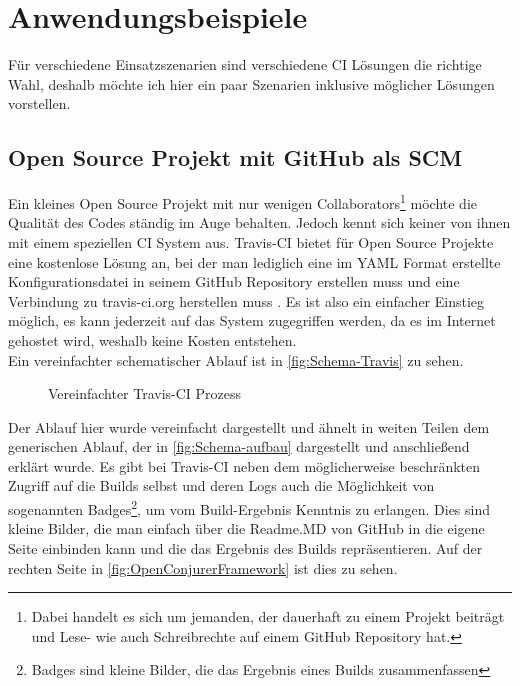 \pagebreak

\chapter{Anwendungsbeispiele}
Für verschiedene Einsatzszenarien sind verschiedene CI Lösungen die richtige Wahl, deshalb möchte ich hier ein paar Szenarien inklusive möglicher Lösungen vorstellen.
\section{Open Source Projekt mit GitHub als SCM}
Ein kleines Open Source Projekt mit nur wenigen Collaborators\footnote{Dabei handelt es sich um jemanden, der dauerhaft zu einem Projekt beiträgt und Lese- wie auch Schreibrechte auf einem GitHub Repository hat.} möchte die Qualität des Codes ständig im Auge behalten. Jedoch kennt sich keiner von ihnen mit einem speziellen CI System aus. Travis-CI bietet für Open Source Projekte eine kostenlose Lösung an, bei der man lediglich eine im YAML Format erstellte Konfigurationsdatei in seinem GitHub Repository erstellen muss und eine Verbindung zu travis-ci.org herstellen muss \cite{Travis-getting-started}. Es ist also ein einfacher Einstieg möglich, es kann jederzeit auf das System zugegriffen werden, da es im Internet gehostet wird, weshalb keine Kosten entstehen.\\
Ein vereinfachter schematischer Ablauf ist in \autoref{fig:Schema-Travis} zu sehen.
\begin{figure}[H]
  \centering
  \caption{Vereinfachter Travis-CI Prozess}\label{fig:Schema-Travis}
\end{figure}
Der Ablauf hier wurde vereinfacht dargestellt und ähnelt in weiten Teilen dem generischen Ablauf, der in \autoref{fig:Schema-aufbau} dargestellt und anschließend erklärt wurde. Es gibt bei Travis-CI neben dem möglicherweise beschränkten Zugriff auf die Builds selbst und deren Logs auch die Möglichkeit von sogenannten Badges\footnote{Badges sind kleine Bilder, die das Ergebnis eines Builds zusammenfassen}, um vom Build-Ergebnis Kenntnis zu erlangen. Dies sind kleine Bilder, die man einfach über die Readme.MD von GitHub in die eigene Seite einbinden kann und die das Ergebnis des Builds repräsentieren. Auf der rechten Seite in \autoref{fig:OpenConjurerFramework} ist dies zu sehen.
